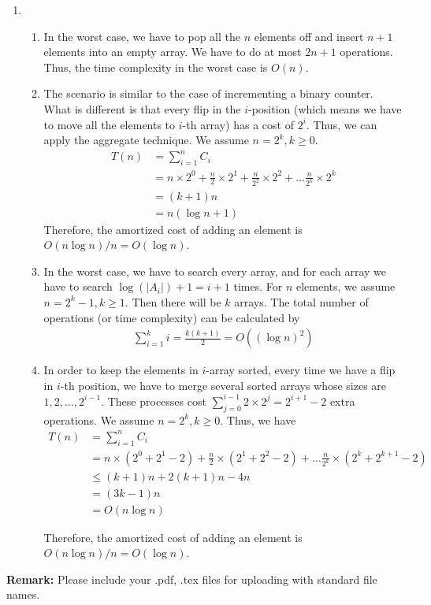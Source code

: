 \documentclass[12pt,a4paper]{article}
\makeatletter
\newtheorem*{solution}{Solution}
\theoremstyle{definition}
\renewenvironment{solution}[1][Solution] {\par\pushQED{\qed}\normalfont\topsep6\p@\@plus6\p@\relax\trivlist\item[\hskip\labelsep\bfseries#1\@addpunct{.}]\ignorespaces}{\popQED\endtrivlist\@endpefalse} \makeatother
\makeatother
\begin{document}
\begin{enumerate}
    \begin{solution}
    ~
    \begin{enumerate}
        \item 
        In the worst case, we have to pop all the $n$ elements off and insert $n+1$ elements into an empty array. We have to do at most $2n+1$ operations. Thus, the time complexity in the worst case is $O(n)$.
        \item
        The scenario is similar to the case of incrementing a binary counter. What is different is that every flip in the $i$-position (which means we have to move all the elements to $i$-th array) has a cost of $2^i$. Thus, we can apply the aggregate technique. We assume $n = 2^k,k\ge 0$.
        \begin{align*}
            T(n) &= \sum_{i=1}^{n} C_i\\
            &= n \times 2^0+\frac{n}{2} \times 2^1 + \frac{n}{2^2}\times  2^2 + \dots \frac{n}{2^k}\times 2^k \\
            &=(k+1)n\\
            &=n(\log n + 1)
        \end{align*}
        Therefore, the amortized cost of adding an element is $O(n\log n)/n = O(\log n)$.
        \item
        In the worst case, we have to search every array, and for each array we have to search $\log(|A_i|)+1 = i+1$ times. For $n$ elements, we assume $n = 2^k-1,k\ge 1$. Then there will be $k$ arrays. The total number of operations (or time complexity) can be calculated by
        \begin{align*}
            \sum_{i=1}^{k} i = \frac{k(k+1)}{2} = O((\log n)^2)
        \end{align*}
        
        \item
        In order to keep the elements in $i$-array sorted, every time we have a flip in $i$-th position, we have to merge several sorted arrays whose sizes are $1,2,\dots,2^{i-1}$. These processes cost $\sum_{j=0}^{i-1} 2\times 2^{j}= 2^{i+1}-2$ extra operations. We assume $n = 2^k,k\ge 0$. Thus, we have
        \begin{align*}
            T(n) &= \sum_{i=1}^{n} C_i\\
            &= n \times (2^0+2^1-2)+\frac{n}{2} \times (2^1+2^2-2) +   \dots \frac{n}{2^k}\times (2^k+2^{k+1}-2) \\
            &\le(k+1)n+2(k+1)n-4n\\
            &=(3k-1)n\\
            &=O(n \log n)
        \end{align*}
        
        Therefore, the amortized cost of adding an element is $O(n\log n)/n = O(\log n)$.
    \end{enumerate}
    \end{solution}
	
\end{enumerate}



\textbf{Remark:} Please include your .pdf, .tex files for uploading with standard file names.


\end{document}
